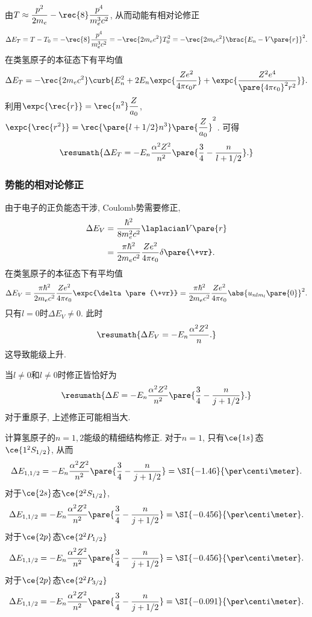\documentclass[hidelinks]{ctexart}
\begin{document}
由$\displaystyle T\approx \frac{p^2}{2m_e} - \rec{8} \frac{p^4}{m_e^3 c^2}$, 从而动能有相对论修正
\[ \Delta E_T = T - T_0 = -\rec{8}\frac{p^4}{m_e^3 c^2} = -\rec{2m_e c^2}T_0^2 = -\rec{2m_ec^2}\brac{E_n - V\pare{r}}^2. \]
在类氢原子的本征态下有平均值
\[ \Delta E_T = -\rec{2m_e c^2}\curb{E_n^2 + 2E_n \expc{\frac{Ze^2}{4\pi\epsilon_0 r}} + \expc{\frac{Z^2 e^4}{\pare{4\pi\epsilon_0}^2 r^2}}}. \]
利用$\displaystyle \expc{\rec{r}} = \rec{n^2} \frac{Z}{a_0}$, $\displaystyle \expc{\rec{r^2}} = \rec{\pare{l+1/2}n^3} \pare{\frac{Z}{a_0}}^2$. 可得
\[ \resumath{\Delta E_T = -E_n \frac{\alpha^2 Z^2}{n^2}\pare{\frac{3}{4} - \frac{n}{l+1/2}}.} \]


\subsubsection{势能的相对论修正} %
\label{ssub:势能的相对论修正}

由于电子的正负能态干涉, Coulomb势需要修正,
\begin{align*}
    \Delta E_V &= \frac{\hbar^2}{8m_e^2c^2} \laplacian V\pare{r} \\
    &= \frac{\pi \hbar^2}{2m_e c^2}\frac{Ze^2}{4\pi\epsilon_0}\delta\pare{\+vr}.
\end{align*}
在类氢原子的本征态下有平均值
\[ \Delta E_V = \frac{\pi \hbar^2}{2m_e c^2}\frac{Ze^2}{4\pi\epsilon_0}\expc{\delta\pare{\+vr}} = \frac{\pi \hbar^2}{2m_e c^2}\frac{Ze^2}{4\pi\epsilon_0}\abs{u_{nlm_l}\pare{0}}^2. \]
只有$l=0$时$\Delta E_V\neq 0$. 此时
\[ \resumath{\Delta E_V = -E_n \frac{\alpha^2 Z^2}{n}.} \]
这导致能级上升.
\par
当$l\neq 0$和$l\neq 0$时修正皆恰好为
\[ \resumath{\Delta E = -E_n \frac{\alpha^2 Z^2}{n^2}\pare{\frac{3}{4} - \frac{n}{j+1/2}}.} \]
对于重原子, 上述修正可能相当大.

\begin{sample}
    \begin{ex}
        计算氢原子的$n=1,2$能级的精细结构修正. 对于$n=1$, 只有$\ce{1s}$态$\ce{1^2S_{1/2}}$, 从而
        \[ \Delta E_{1,1/2} = -E_n \frac{\alpha^2 Z^2}{n^2} \pare{\frac{3}{4} - \frac{n}{j+1/2}} = \SI{-1.46}{\per\centi\meter}. \]
        对于$\ce{2s}$态$\ce{2^2S_{1/2}}$,
        \[ \Delta E_{1,1/2} = -E_n \frac{\alpha^2 Z^2}{n^2} \pare{\frac{3}{4} - \frac{n}{j+1/2}} = \SI{-0.456}{\per\centi\meter}. \]
        对于$\ce{2p}$态$\ce{2^2P_{1/2}}$
        \[ \Delta E_{1,1/2} = -E_n \frac{\alpha^2 Z^2}{n^2} \pare{\frac{3}{4} - \frac{n}{j+1/2}} = \SI{-0.456}{\per\centi\meter}. \]
        对于$\ce{2p}$态$\ce{2^2P_{3/2}}$
        \[ \Delta E_{1,1/2} = -E_n \frac{\alpha^2 Z^2}{n^2} \pare{\frac{3}{4} - \frac{n}{j+1/2}} = \SI{-0.091}{\per\centi\meter}. \]
    \end{ex}
\end{sample}
\end{document}
